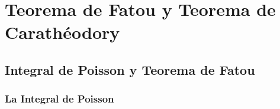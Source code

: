 \chapter{Teorema de Fatou y Teorema de Carathéodory}

\begin{comment}
    \begin{theorem}[Lema de Schwart]
        Sea $f: \disk \rightarrow \closedisk$ una función $\in \holomorphic{\disk}$ tal que $f(0) = 0$. Entonces:
        \begin{itemize}
            \item $\abs{f(z)} \leq \abs{z}$ para todo $z \in \disk$.
            \item Si para algún $z_0 \not = 0$ tenemos que $\abs{f(z_0)} = \abs{z_0}$, entonces existe $\alpha \in \complex, \abs{\alpha} = 1$ tal que $f(z)=\alpha z$.
        \end{itemize}
    \end{theorem}

    \begin{proof}
        Sea $f(z) = a_1z + \cdots$ la serie de potencias de $f$. El término constante es $0$ puesto que suponemos que $f(0) = 0$. Entonces $f(z)/z$ es una función holomorfa y
        \begin{equation*}
            \abs{\dfrac{f(z)}{z}} < 1/r \text{ para } \abs{z} = r < 1
        \end{equation*}
    \end{proof}
\end{comment}

\section{Integral de Poisson y Teorema de Fatou}

\subsection{La Integral de Poisson}

